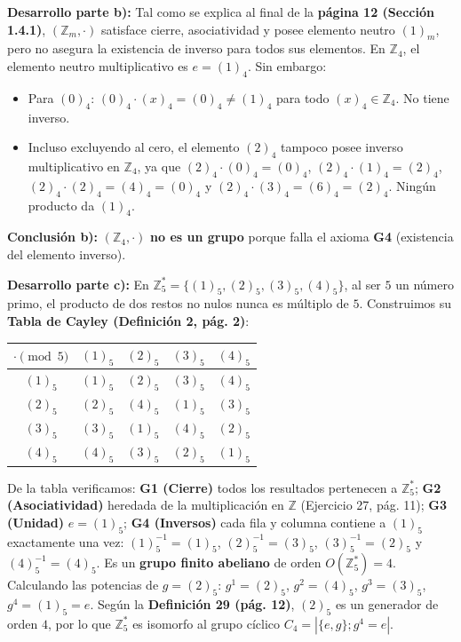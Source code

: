 \documentclass[11pt, a4paper]{article}
\begin{document}
\vspace{2mm}
\noindent \textbf{Desarrollo parte b):} Tal como se explica al final de la \textbf{página 12 (Sección 1.4.1)}, $(\mathbb{Z}_m, \cdot)$ satisface cierre, asociatividad y posee elemento neutro $(1)_m$, pero no asegura la existencia de inverso para todos sus elementos. En $\mathbb{Z}_4$, el elemento neutro multiplicativo es $e = (1)_4$. Sin embargo:
\begin{itemize}
    \item Para $(0)_4$: $(0)_4 \cdot (x)_4 = (0)_4 \neq (1)_4$ para todo $(x)_4 \in \mathbb{Z}_4$. No tiene inverso.
    \item Incluso excluyendo al cero, el elemento $(2)_4$ tampoco posee inverso multiplicativo en $\mathbb{Z}_4$, ya que $(2)_4 \cdot (0)_4 = (0)_4$, $(2)_4 \cdot (1)_4 = (2)_4$, $(2)_4 \cdot (2)_4 = (4)_4 = (0)_4$ y $(2)_4 \cdot (3)_4 = (6)_4 = (2)_4$. Ningún producto da $(1)_4$.
\end{itemize}
\textbf{Conclusión b):} $(\mathbb{Z}_4, \cdot)$ \textbf{no es un grupo} porque falla el axioma \textbf{G4} (existencia del elemento inverso).

\vspace{2mm}
\noindent \textbf{Desarrollo parte c):} En $\mathbb{Z}_5^* = \{(1)_5, (2)_5, (3)_5, (4)_5\}$, al ser $5$ un número primo, el producto de dos restos no nulos nunca es múltiplo de $5$. Construimos su \textbf{Tabla de Cayley (Definición 2, pág. 2)}:
\begin{center}
\begin{tabular}{c|cccc}
\toprule
$\cdot \pmod 5$ & $(1)_5$ & $(2)_5$ & $(3)_5$ & $(4)_5$ \\
\midrule
$(1)_5$ & $(1)_5$ & $(2)_5$ & $(3)_5$ & $(4)_5$ \\
$(2)_5$ & $(2)_5$ & $(4)_5$ & $(1)_5$ & $(3)_5$ \\
$(3)_5$ & $(3)_5$ & $(1)_5$ & $(4)_5$ & $(2)_5$ \\
$(4)_5$ & $(4)_5$ & $(3)_5$ & $(2)_5$ & $(1)_5$ \\
\bottomrule
\end{tabular}
\end{center}
De la tabla verificamos: \textbf{G1 (Cierre)} todos los resultados pertenecen a $\mathbb{Z}_5^*$; \textbf{G2 (Asociatividad)} heredada de la multiplicación en $\mathbb{Z}$ (Ejercicio 27, pág. 11); \textbf{G3 (Unidad)} $e = (1)_5$; \textbf{G4 (Inversos)} cada fila y columna contiene a $(1)_5$ exactamente una vez: $(1)_5^{-1} = (1)_5$, $(2)_5^{-1} = (3)_5$, $(3)_5^{-1} = (2)_5$ y $(4)_5^{-1} = (4)_5$.
Es un \textbf{grupo finito abeliano} de orden $O(\mathbb{Z}_5^*) = 4$. Calculando las potencias de $g = (2)_5$: $g^1 = (2)_5$, $g^2 = (4)_5$, $g^3 = (3)_5$, $g^4 = (1)_5 = e$. Según la \textbf{Definición 29 (pág. 12)}, $(2)_5$ es un generador de orden $4$, por lo que $\mathbb{Z}_5^*$ es isomorfo al grupo cíclico $C_4 = |\{e, g\}; g^4 = e|$.
\end{document}
